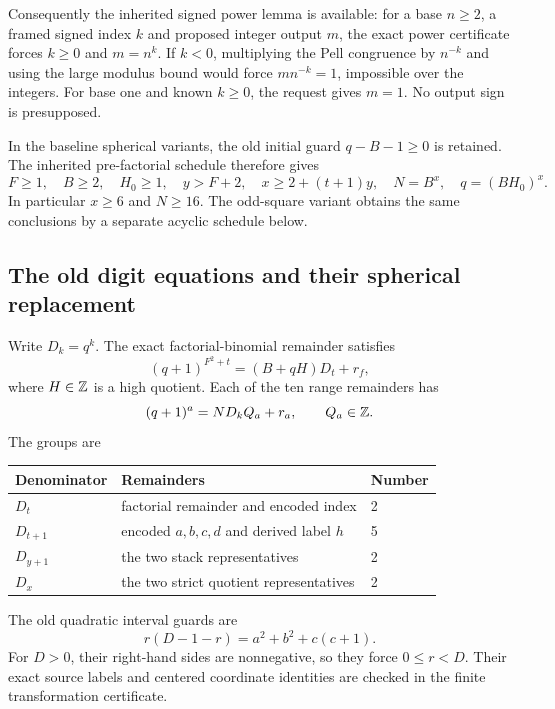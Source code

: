 Consequently the inherited signed power lemma is available: for a base
$n\ge2$, a framed signed index $k$ and proposed integer output $m$, the
exact power certificate forces $k\ge0$ and $m=n^k$. If $k<0$, multiplying
the Pell congruence by $n^{-k}$ and using the large modulus bound would
force $mn^{-k}=1$, impossible over the integers. For base one and known
$k\ge0$, the request gives $m=1$. No output sign is presupposed.

In the baseline spherical variants, the old initial guard $q-B-1\ge0$
is retained. The inherited pre-factorial schedule therefore gives
\begin{equation}\label{eq:signedpreconditions}
 F\ge1,\quad B\ge2,\quad H_0\ge1,\quad y>F+2,\quad
 x\ge2+(t+1)y,\quad N=B^x,\quad q=(BH_0)^x.
\end{equation}
In particular $x\ge6$ and $N\ge16$. The odd-square variant obtains the
same conclusions by a separate acyclic schedule below.

\subsection{The old digit equations and their spherical replacement}
Write $D_k=q^k$. The exact factorial-binomial remainder satisfies
\begin{equation}\label{eq:signedfactorialdigit}
 (q+1)^{F^2+t}=(B+qH)D_t+r_f,
\end{equation}
where $H\in\mathbb Z$ is a high quotient. Each of the ten range remainders has
\begin{equation}\label{eq:signedrangedigit}
 (q+1)^a=ND_kQ_a+r_a,\qquad Q_a\in\mathbb Z.
\end{equation}
The groups are
\begin{center}\small
\begin{tabular}{@{}lll@{}}\toprule
Denominator & Remainders & Number\\\midrule
$D_t$ & factorial remainder and encoded index & 2\\
$D_{t+1}$ & encoded $a,b,c,d$ and derived label $h$ & 5\\
$D_{y+1}$ & the two stack representatives & 2\\
$D_x$ & the two strict quotient representatives & 2\\\bottomrule
\end{tabular}
\end{center}
The old quadratic interval guards are
\begin{equation}\label{eq:oldinterval}
 r(D-1-r)=a^2+b^2+c(c+1).
\end{equation}
For $D>0$, their right-hand sides are nonnegative, so they force
$0\le r<D$. Their exact source labels and centered coordinate identities
are checked in the finite transformation certificate.

